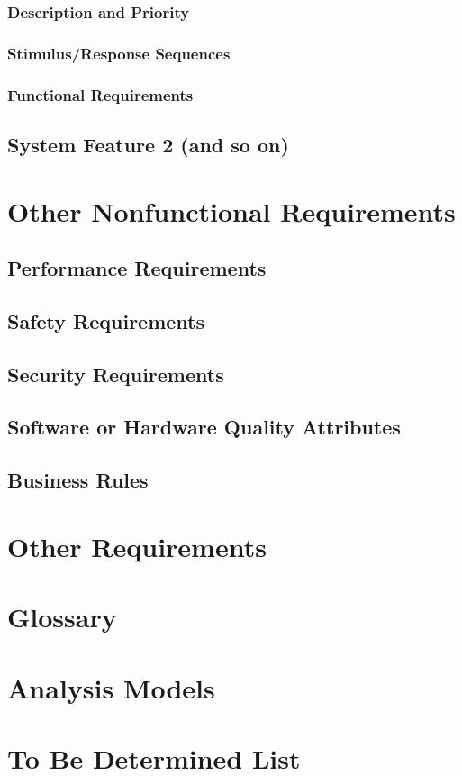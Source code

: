 \documentclass[english]{article}
\numberwithin{equation}{section} %
\begin{document}
\subsubsection{Description and Priority}
\subsubsection{Stimulus/Response Sequences}
\subsubsection{Functional Requirements}
\subsection{System Feature 2 (and so on)}

\newpage
\section{Other Nonfunctional Requirements}
\subsection{Performance Requirements}
\subsection{Safety Requirements}
\subsection{Security Requirements}
\subsection{Software or Hardware Quality Attributes}
\subsection{Business Rules}

\newpage
\section{Other Requirements}
\appendix
\section{Glossary}
\section{Analysis Models}
\section{To Be Determined List}
\end{document}
